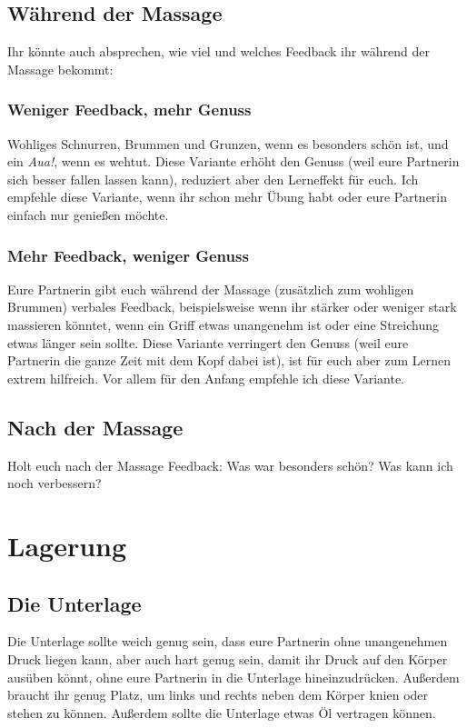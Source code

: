\subsection{Während der Massage}

Ihr könnte auch absprechen, wie viel und welches Feedback ihr während der Massage bekommt:

\subsubsection{Weniger Feedback, mehr Genuss}
Wohliges Schnurren, Brummen und Grunzen, wenn es besonders schön ist, und ein \emph{Aua!}, wenn es wehtut. Diese Variante erhöht den Genuss (weil eure Partnerin sich besser fallen lassen kann), reduziert aber den Lerneffekt für euch. Ich empfehle diese Variante, wenn ihr schon mehr Übung habt oder eure Partnerin einfach nur genießen möchte.

\subsubsection{Mehr Feedback, weniger Genuss}
Eure Partnerin gibt euch während der Massage (zusätzlich zum wohligen Brummen) verbales Feedback, beispielsweise wenn ihr stärker oder weniger stark massieren könntet, wenn ein Griff etwas unangenehm ist oder eine Streichung etwas länger sein sollte. Diese Variante verringert den Genuss (weil eure Partnerin die ganze Zeit mit dem Kopf dabei ist), ist für euch aber zum Lernen extrem hilfreich. Vor allem für den Anfang empfehle ich diese Variante.

\subsection{Nach der Massage}

Holt euch nach der Massage Feedback: Was war besonders schön? Was kann ich noch verbessern?


\section{Lagerung}

\subsection{Die Unterlage}

Die Unterlage sollte weich genug sein, dass eure Partnerin ohne unangenehmen Druck liegen kann, aber auch hart genug sein, damit ihr Druck auf den Körper ausüben könnt, ohne eure Partnerin in die Unterlage hineinzudrücken. Außerdem braucht ihr genug Platz, um links und rechts neben dem Körper knien oder stehen zu können. Außerdem sollte die Unterlage etwas Öl vertragen können.

